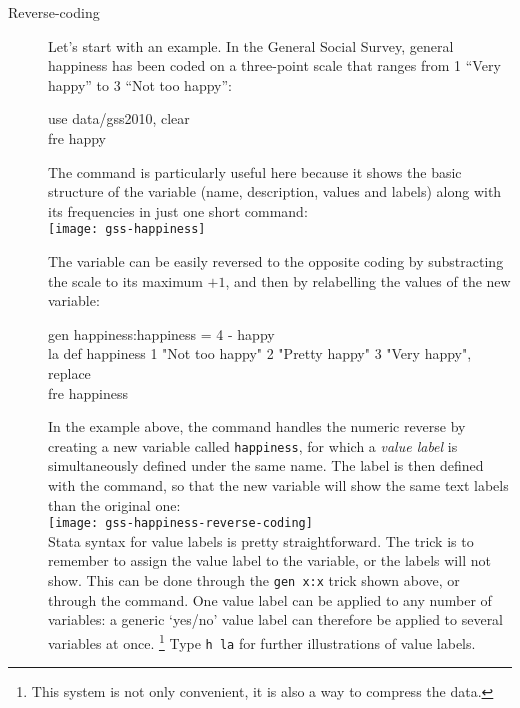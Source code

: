 \begin{description}

	\item[Reverse-coding]%
	Let's start with an example. In the General Social Survey, general happiness has been coded on a three-point scale that ranges from 1 ``Very happy'' to 3 ``Not too happy'': 

\begin{docspec}
	use data/gss2010, clear\\
	fre happy\\
\end{docspec}

The  command is particularly useful here because it shows the basic structure of the variable (name, description, values and labels) along with its frequencies in just one short command:\\[1em]

	\texttt{[image: gss-happiness]}

The variable can be easily reversed to the opposite coding by substracting the scale to its maximum $+ 1$, and then by relabelling the values of the new variable:

\begin{fullwidth}
	\begin{docspec}
		gen happiness:happiness = 4 - happy\\
		la def happiness 1 "Not too happy" 2 "Pretty happy" 3 "Very happy", replace\\
		fre happiness
	\end{docspec}
\end{fullwidth}

In the example above, the  command handles the numeric reverse by creating a new variable called \texttt{happiness}, for which a \emph{value label} is simultaneously defined under the same name. The label is then defined with the  command, so that the new variable will show the same text labels than the original one:\\[1em]

	\texttt{[image: gss-happiness-reverse-coding]}\\[1em]

%
Stata syntax for value labels is pretty straightforward. The trick is to remember to assign the value label to the variable, or the labels will not show. This can be done through the \texttt{gen x:x} trick shown above, or through the  command. One value label can be applied to any number of variables: a generic `yes/no' value label can therefore be applied to several variables at once.%
	\footnote{This system is not only convenient, it is also a way to compress the data.}
Type \texttt{h la} for further illustrations of value labels.


\end{description}
